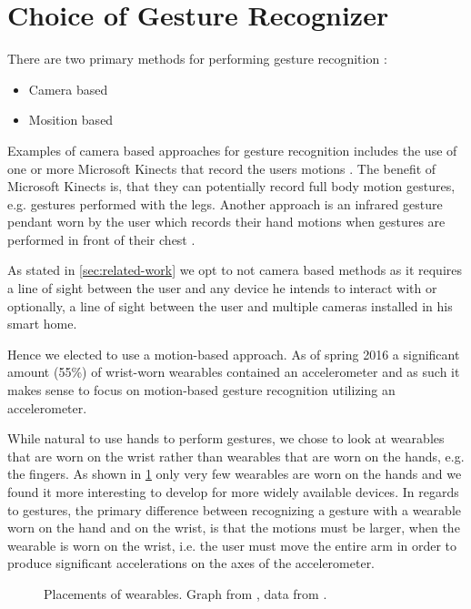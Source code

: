 \section{Choice of Gesture Recognizer}
\label{sec:analysis:choice-of-gesture-recognizer}

There are two primary methods for performing gesture recognition \cite[pp. 19-21]{prespecialisation}:

\begin{itemize}
\item Camera based
\item Mosition based
\end{itemize}

Examples of camera based approaches for gesture recognition includes the use of one or more Microsoft Kinects that record the users motions \cite{caon2011context}. The benefit of Microsoft Kinects is, that they can potentially record full body motion gestures, e.g. gestures performed with the legs. Another approach is an infrared gesture pendant worn by the user which records their hand motions when gestures are performed in front of their chest \cite{starner2000gesture}.

As stated in \cref{sec:related-work} we opt to not camera based methods as it requires a line of sight between the user and any device he intends to interact with or optionally, a line of sight between the user and multiple cameras installed in his smart home.

Hence we elected to use a motion-based approach. As of spring 2016 a significant amount (55\%) of wrist-worn wearables contained an accelerometer \cite[pp. 2-3]{prespecialisation} and as such it makes sense to focus on motion-based gesture recognition utilizing an accelerometer.

While natural to use hands to perform gestures, we chose to look at wearables that are worn on the wrist rather than wearables that are worn on the hands, e.g. the fingers. As shown in \cref{fig:wearables-placement} only very few wearables are worn on the hands and we found it more interesting to develop for more widely available devices. In regards to gestures, the primary difference between recognizing a gesture with a wearable worn on the hand and on the wrist, is that the motions must be larger, when the wearable is worn on the wrist, i.e. the user must move the entire arm in order to produce significant accelerations on the axes of the accelerometer.

\begin{figure}[!htb]
  \centering
  
  \caption{Placements of wearables. Graph from \cite[p. 2]{prespecialisation}, data from \protect\cite{LISTOFWEARABLES}.}
  \label{fig:wearables-placement}
\end{figure}

